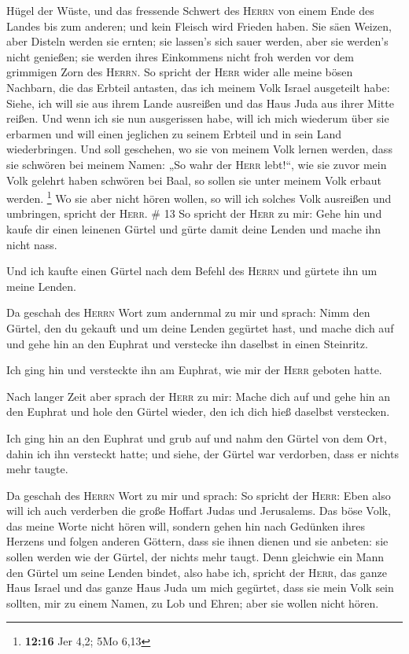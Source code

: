 Hügel der Wüste, und das fressende Schwert des \textsc{Herrn} von einem
Ende des Landes bis zum anderen; und kein Fleisch wird Frieden haben.
 Sie säen Weizen, aber Disteln werden sie ernten; sie
lassen's sich sauer werden, aber sie werden's nicht genießen; sie werden
ihres Einkommens nicht froh werden vor dem grimmigen Zorn des
\textsc{Herrn}.  So spricht der \textsc{Herr} wider alle
meine bösen Nachbarn, die das Erbteil antasten, das ich meinem Volk
Israel ausgeteilt habe: Siehe, ich will sie aus ihrem Lande ausreißen
und das Haus Juda aus ihrer Mitte reißen.  Und wenn ich
sie nun ausgerissen habe, will ich mich wiederum über sie erbarmen und
will einen jeglichen zu seinem Erbteil und in sein Land wiederbringen.
 Und soll geschehen, wo sie von meinem Volk lernen
werden, dass sie schwören bei meinem Namen: „So wahr der \textsc{Herr}
lebt!{}``, wie sie zuvor mein Volk gelehrt haben schwören bei Baal, so
sollen sie unter meinem Volk erbaut werden. \footnote{\textbf{12:16} Jer
  4,2; 5Mo 6,13}  Wo sie aber nicht hören wollen, so will
ich solches Volk ausreißen und umbringen, spricht der \textsc{Herr}. \#
13  So spricht der \textsc{Herr} zu mir: Gehe hin und
kaufe dir einen leinenen Gürtel und gürte damit deine Lenden und mache
ihn nicht nass.

 Und ich kaufte einen Gürtel nach dem Befehl des
\textsc{Herrn} und gürtete ihn um meine Lenden.

 Da geschah des \textsc{Herrn} Wort zum andernmal zu mir
und sprach:  Nimm den Gürtel, den du gekauft und um deine
Lenden gegürtet hast, und mache dich auf und gehe hin an den Euphrat und
verstecke ihn daselbst in einen Steinritz.

 Ich ging hin und versteckte ihn am Euphrat, wie mir der
\textsc{Herr} geboten hatte.

 Nach langer Zeit aber sprach der \textsc{Herr} zu mir:
Mache dich auf und gehe hin an den Euphrat und hole den Gürtel wieder,
den ich dich hieß daselbst verstecken.

 Ich ging hin an den Euphrat und grub auf und nahm den
Gürtel von dem Ort, dahin ich ihn versteckt hatte; und siehe, der Gürtel
war verdorben, dass er nichts mehr taugte.

 Da geschah des \textsc{Herrn} Wort zu mir und sprach:
 So spricht der \textsc{Herr}: Eben also will ich auch
verderben die große Hoffart Judas und Jerusalems.  Das
böse Volk, das meine Worte nicht hören will, sondern gehen hin nach
Gedünken ihres Herzens und folgen anderen Göttern, dass sie ihnen dienen
und sie anbeten: sie sollen werden wie der Gürtel, der nichts mehr
taugt.  Denn gleichwie ein Mann den Gürtel um seine
Lenden bindet, also habe ich, spricht der \textsc{Herr}, das ganze Haus
Israel und das ganze Haus Juda um mich gegürtet, dass sie mein Volk sein
sollten, mir zu einem Namen, zu Lob und Ehren; aber sie wollen nicht
hören.

